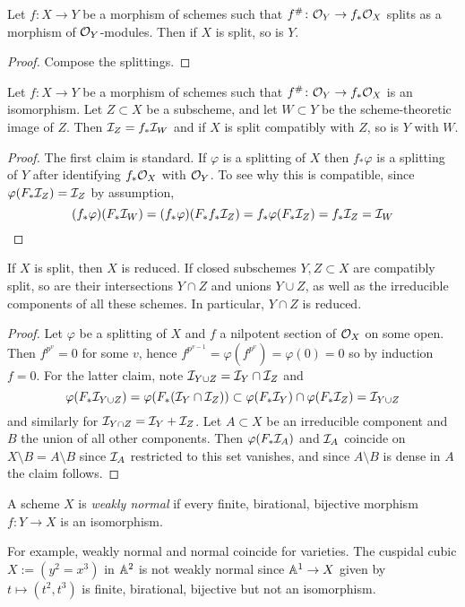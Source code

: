 \documentclass[12pt]{article}
\begin{document}
    \begin{lem}
        Let $f \colon X \to Y$ be a morphism of schemes such that $f^{\#} \colon \mathcal{O}_Y \to f_* \mathcal{O}_X$ splits as a morphism of $\mathcal{O}_Y$-modules. Then if $X$ is split, so is $Y$.
    \end{lem}
    \begin{proof}
        Compose the splittings.
    \end{proof}

    \begin{lem}
        Let $f \colon X \to Y$ be a morphism of schemes such that $f^{\#} \colon \mathcal{O}_Y \to f_* \mathcal{O}_X$ is an isomorphism. Let $Z \subset X$ be a subscheme, and let $W \subset Y$ be the scheme-theoretic image of $Z$. Then $\mathcal{I}_Z = f_* \mathcal{I}_W$ and if $X$ is split compatibly with $Z$, so is $Y$ with $W$.
    \end{lem}
    \begin{proof}
        The first claim is standard. If $\varphi$ is a splitting of $X$ then $f_* \varphi$ is a splitting of $Y$ after identifying $f_* \mathcal{O}_X$ with $\mathcal{O}_Y$. To see why this is compatible, since $\varphi(F_*\mathcal{I}_Z) = \mathcal{I}_Z$ by assumption,
        \[(f_* \varphi)(F_* \mathcal{I}_W) = (f_* \varphi)(F_* f_* \mathcal{I}_Z) = f_*\varphi(F_* \mathcal{I}_Z) = f_* \mathcal{I}_Z = \mathcal{I}_W \]
    \end{proof}

    \begin{prop}
        If $X$ is split, then $X$ is reduced. If closed subschemes $Y,Z \subset X$ are compatibly split, so are their intersections $Y \cap Z$ and unions $Y \cup Z$, as well as the irreducible components of all these schemes. In particular, $Y \cap Z$ is reduced.
    \end{prop}
    \begin{proof}
        Let $\varphi$ be a splitting of $X$ and $f$ a nilpotent section of $\mathcal{O}_X$ on some open. Then $f^{p^v} = 0$ for some $v$, hence $f^{p^{v-1}} = \varphi(f^{p^v}) = \varphi(0) = 0$ so by induction $f = 0$. For the latter claim, note $\mathcal{I}_{Y \cup Z} = \mathcal{I}_Y \cap \mathcal{I}_Z$ and 
        \[\varphi(F_* \mathcal{I}_{Y \cup Z}) = \varphi(F_* (\mathcal{I}_Y \cap \mathcal{I}_Z)) \subset \varphi(F_* \mathcal{I}_Y) \cap \varphi(F_* \mathcal{I}_Z) = \mathcal{I}_{Y \cup Z}\]
        and similarly for $\mathcal{I}_{Y \cap Z} = \mathcal{I}_Y + \mathcal{I}_Z$. Let $A \subset X$ be an irreducible component and $B$ the union of all other components. Then $\varphi(F_* \mathcal{I}_A)$ and $\mathcal{I}_A$ coincide on $X \setminus B = A \setminus B$ since $\mathcal{I}_A$ restricted to this set vanishes, and since $A \setminus B$ is dense in $A$ the claim follows.
    \end{proof}
\begin{defn}
    A scheme $X$ is \textit{weakly normal} if every finite, birational, bijective morphism $f \colon Y \to X$ is an isomorphism.
\end{defn}
For example, weakly normal and normal coincide for varieties. The cuspidal cubic $X := (y^2 = x^3)$ in $\mathbb{A}^2$ is not weakly normal since $\mathbb{A}^1 \to X$ given by $t \mapsto (t^2, t^3)$ is finite, birational, bijective but not an isomorphism. 
\end{document}
